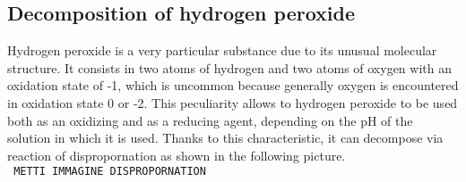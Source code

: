 \documentclass[a4paper]{report}
\begin{document}
\subsection{Decomposition of hydrogen peroxide}

Hydrogen peroxide is a very particular substance due to its unusual molecular structure. It consists in two atoms of hydrogen and two atoms of oxygen with an oxidation state of -1, which is uncommon because generally oxygen is encountered in oxidation state 0 or -2. This peculiarity allows to hydrogen peroxide to be used both as an oxidizing and as a reducing agent, depending on the pH of the solution in which it is used. Thanks to this characteristic, it can decompose via reaction of dispropornation as shown in the following picture.\\ %

\texttt{\color{red} METTI IMMAGINE DISPROPORNATION}
\end{document}
